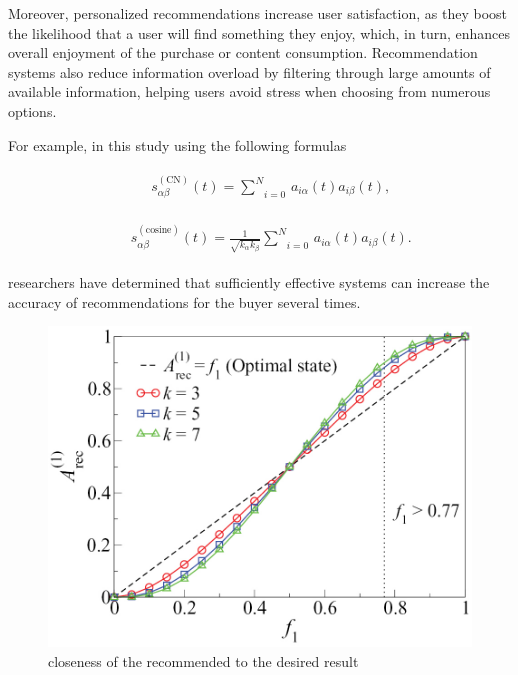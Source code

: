 \documentclass[10pt,twoside,slovak,a4paper]{article}
\begin{document}
\newpage
Moreover, personalized recommendations increase user satisfaction, as they boost the likelihood that a user will find something they enjoy, which, in turn, enhances overall enjoyment of the purchase or content consumption. Recommendation systems also reduce information overload by filtering through large amounts of available information, helping users avoid stress when choosing from numerous options.

For example, in this study \cite{closeness}using the following formulas

\begin{eqnarray}
    &&\begin{array}{*{35}{l}}
        s_{\alpha \beta}^{\left(\text{CN}\right)}(t)=\underset{i=0}{\overset{N}{\sum}}\,{{a}_{i\alpha}}(t){{a}_{i\beta}}(t), 
    \end{array}
\end{eqnarray}

\begin{eqnarray}
    &&\begin{array}{*{35}{l}}
        s_{\alpha \beta}^{\left(\text{cosine}\right)}(t)=\frac{1}{\sqrt{{{k}_{\alpha}}{{k}_{\beta}}}}\underset{i=0}{\overset{N}{\sum}}\,{{a}_{i\alpha}}(t){{a}_{i\beta}}(t). 
    \end{array}
\end{eqnarray}

researchers have determined that
sufficiently effective systems can increase the accuracy of recommendations for the buyer several times.
\begin{figure}[!h]
    \centering
    \includegraphics[width=0.9\linewidth]{picture.jpg}
    \caption{closeness of the recommended to the desired result}
    \label{fig:closeness}
\end{figure}
\end{document}
